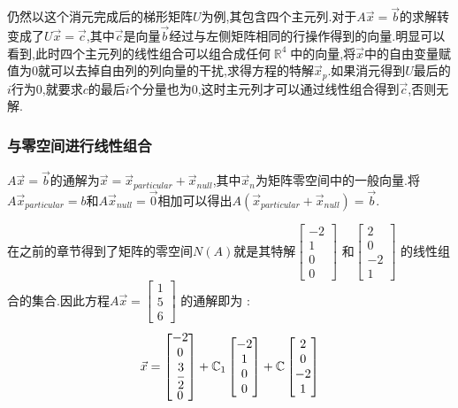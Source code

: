 \documentclass[UTF8,12pt]{ctexbook}
\newcommand{\mathConstant}{\mathbb{C}}
\DeclareMathOperator{\mathRealNumberCollection}{\mathbb{R}}
\begin{document}
{{{{{  仍然以这个消元完成后的梯形矩阵$U$为例,其包含四个主元列.对于$A\vec{x} = \vec{b}$的求解转变成了$U\vec{x} = \vec{c}$,其中$\vec{c}$是向量$\vec{b}$经过与左侧矩阵相同的行操作得到的向量.明显可以看到,此时四个主元列的线性组合可以组合成任何$\mathRealNumberCollection^4$中的向量,将$\vec{x}$中的自由变量赋值为0就可以去掉自由列的列向量的干扰,求得方程的特解$\vec{x}_p$.如果消元得到$U$最后的$i$行为0,就要求$c$的最后$i$个分量也为0,这时主元列才可以通过线性组合得到$\vec{c}$,否则无解.
}%

\subsubsection{与零空间进行线性组合}{
  $A\vec{x} = \vec{b}$的通解为$\vec{x} = \vec{x}_{particular} + \vec{x}_{null}$,其中$\vec{x}_n$为矩阵零空间中的一般向量.将$A\vec{x}_{particular} = b$和$A\vec{x}_{null} = \vec{0}$相加可以得出$A(\vec{x}_{particular} + \vec{x}_{null}) = \vec{b}$.

  在之前的章节得到了矩阵的零空间$N(A)$就是其特解$\begin{bmatrix}
      -2 \\
      1  \\
      0  \\
      0
    \end{bmatrix}$
  和$\begin{bmatrix}
      2  \\
      0  \\
      -2 \\
      1
    \end{bmatrix}$
  的线性组合的集合.因此方程$A\vec{x} = \begin{bmatrix}
      1 \\
      5 \\
      6
    \end{bmatrix}$
  的通解即为 : $$
    \vec{x} = \begin{bmatrix}
      -2           \\
      0            \\
      \cfrac{3}{2} \\
      0
    \end{bmatrix}
    +
    \mathConstant_1\begin{bmatrix}
      -2 \\
      1  \\
      0  \\
      0
    \end{bmatrix}
    +
    \mathConstant\begin{bmatrix}
      2  \\
      0  \\
      -2 \\
      1
    \end{bmatrix}
  $$

}}}}}
\end{document}
